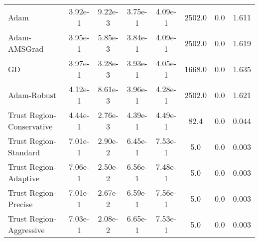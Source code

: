 \documentclass{article}
\begin{document}
\begin{table}[htbp]
{\begin{tabular}{p{2.5cm}*{7}{c}}
Adam & 3.92e-1 & 9.22e-3 & 3.75e-1 & 4.09e-1 & 2502.0 & 0.0 & 1.611 \\
Adam-AMSGrad & 3.95e-1 & 5.85e-3 & 3.84e-1 & 4.09e-1 & 2502.0 & 0.0 & 1.619 \\
GD & 3.97e-1 & 3.28e-3 & 3.93e-1 & 4.05e-1 & 1668.0 & 0.0 & 1.635 \\
Adam-Robust & 4.12e-1 & 8.61e-3 & 3.96e-1 & 4.28e-1 & 2502.0 & 0.0 & 1.621 \\
Trust Region-Conservative & 4.44e-1 & 2.76e-3 & 4.39e-1 & 4.49e-1 & 82.4 & 0.0 & 0.044 \\
Trust Region-Standard & 7.01e-1 & 2.90e-2 & 6.45e-1 & 7.53e-1 & 5.0 & 0.0 & 0.003 \\
Trust Region-Adaptive & 7.06e-1 & 2.50e-2 & 6.56e-1 & 7.48e-1 & 5.0 & 0.0 & 0.003 \\
Trust Region-Precise & 7.01e-1 & 2.67e-2 & 6.59e-1 & 7.56e-1 & 5.0 & 0.0 & 0.003 \\
Trust Region-Aggressive & 7.03e-1 & 2.08e-2 & 6.65e-1 & 7.53e-1 & 5.0 & 0.0 & 0.003 \\
\bottomrule
\end{tabular}
}
\end{table}
\end{document}
